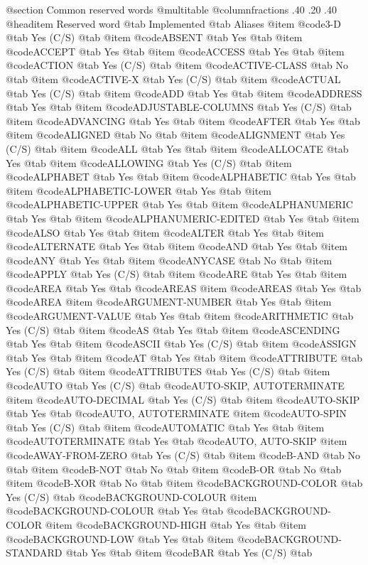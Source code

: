 @section Common reserved words
@multitable @columnfractions .40 .20 .40
@headitem Reserved word @tab Implemented @tab Aliases
@item @code{3-D} @tab Yes	(C/S) @tab
@item @code{ABSENT} @tab Yes @tab
@item @code{ACCEPT} @tab Yes @tab
@item @code{ACCESS} @tab Yes @tab
@item @code{ACTION} @tab Yes	(C/S) @tab
@item @code{ACTIVE-CLASS} @tab No @tab
@item @code{ACTIVE-X} @tab Yes	(C/S) @tab
@item @code{ACTUAL} @tab Yes (C/S) @tab
@item @code{ADD} @tab Yes @tab
@item @code{ADDRESS} @tab Yes @tab
@item @code{ADJUSTABLE-COLUMNS} @tab Yes	(C/S) @tab
@item @code{ADVANCING} @tab Yes @tab
@item @code{AFTER} @tab Yes @tab
@item @code{ALIGNED} @tab No @tab
@item @code{ALIGNMENT} @tab Yes	(C/S) @tab
@item @code{ALL} @tab Yes @tab
@item @code{ALLOCATE} @tab Yes @tab
@item @code{ALLOWING} @tab Yes	(C/S) @tab
@item @code{ALPHABET} @tab Yes @tab
@item @code{ALPHABETIC} @tab Yes @tab
@item @code{ALPHABETIC-LOWER} @tab Yes @tab
@item @code{ALPHABETIC-UPPER} @tab Yes @tab
@item @code{ALPHANUMERIC} @tab Yes @tab
@item @code{ALPHANUMERIC-EDITED} @tab Yes @tab
@item @code{ALSO} @tab Yes @tab
@item @code{ALTER} @tab Yes @tab
@item @code{ALTERNATE} @tab Yes @tab
@item @code{AND} @tab Yes @tab
@item @code{ANY} @tab Yes @tab
@item @code{ANYCASE} @tab No @tab
@item @code{APPLY} @tab Yes	(C/S) @tab
@item @code{ARE} @tab Yes @tab
@item @code{AREA} @tab Yes @tab @code{AREAS}
@item @code{AREAS} @tab Yes @tab @code{AREA}
@item @code{ARGUMENT-NUMBER} @tab Yes @tab
@item @code{ARGUMENT-VALUE} @tab Yes @tab
@item @code{ARITHMETIC} @tab Yes	(C/S) @tab
@item @code{AS} @tab Yes @tab
@item @code{ASCENDING} @tab Yes @tab
@item @code{ASCII} @tab Yes	(C/S) @tab
@item @code{ASSIGN} @tab Yes @tab
@item @code{AT} @tab Yes @tab
@item @code{ATTRIBUTE} @tab Yes	(C/S) @tab
@item @code{ATTRIBUTES} @tab Yes	(C/S) @tab
@item @code{AUTO} @tab Yes	(C/S) @tab @code{AUTO-SKIP, AUTOTERMINATE}
@item @code{AUTO-DECIMAL} @tab Yes	(C/S) @tab
@item @code{AUTO-SKIP} @tab Yes @tab @code{AUTO, AUTOTERMINATE}
@item @code{AUTO-SPIN} @tab Yes	(C/S) @tab
@item @code{AUTOMATIC} @tab Yes @tab
@item @code{AUTOTERMINATE} @tab Yes @tab @code{AUTO, AUTO-SKIP}
@item @code{AWAY-FROM-ZERO} @tab Yes	(C/S) @tab
@item @code{B-AND} @tab No @tab
@item @code{B-NOT} @tab No @tab
@item @code{B-OR} @tab No @tab
@item @code{B-XOR} @tab No @tab
@item @code{BACKGROUND-COLOR} @tab Yes	(C/S) @tab @code{BACKGROUND-COLOUR}
@item @code{BACKGROUND-COLOUR} @tab Yes @tab @code{BACKGROUND-COLOR}
@item @code{BACKGROUND-HIGH} @tab Yes @tab
@item @code{BACKGROUND-LOW} @tab Yes @tab
@item @code{BACKGROUND-STANDARD} @tab Yes @tab
@item @code{BAR} @tab Yes	(C/S) @tab
